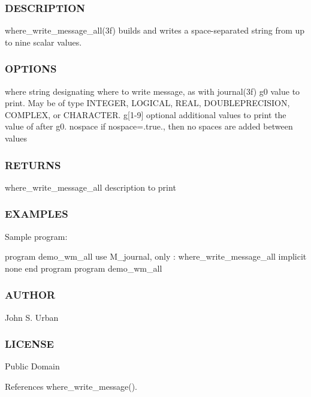 \subsubsection*{D\+E\+S\+C\+R\+I\+P\+T\+I\+ON}

where\+\_\+write\+\_\+message\+\_\+all(3f) builds and writes a space-\/separated string from up to nine scalar values.

\subsubsection*{O\+P\+T\+I\+O\+NS}

\begin{DoxyVerb}where    string designating where to write message, as with journal(3f)
g0       value to print. May
         be of type INTEGER, LOGICAL, REAL, DOUBLEPRECISION, COMPLEX,
         or CHARACTER.
g[1-9]   optional additional values to print the value of after g0.
nospace  if nospace=.true., then no spaces are added between values
\end{DoxyVerb}
 \subsubsection*{R\+E\+T\+U\+R\+NS}

where\+\_\+write\+\_\+message\+\_\+all description to print

\subsubsection*{E\+X\+A\+M\+P\+L\+ES}

Sample program\+:

program demo\+\_\+wm\+\_\+all use M\+\_\+journal, only \+: where\+\_\+write\+\_\+message\+\_\+all implicit none end program program demo\+\_\+wm\+\_\+all \subsubsection*{A\+U\+T\+H\+OR}

John S. Urban \subsubsection*{L\+I\+C\+E\+N\+SE}

Public Domain 

References where\+\_\+write\+\_\+message().

